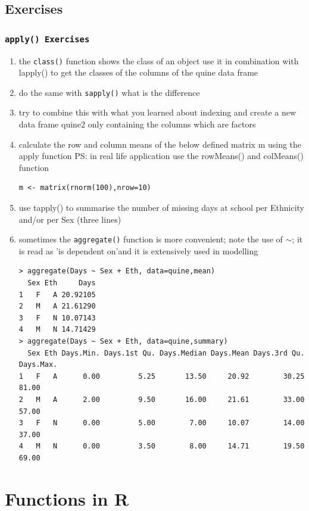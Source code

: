\documentclass[xcolor={table},c]{beamer}
\begin{document}
\subsection{Exercises}
\begin{frame}\frametitle{\texttt{\texttt{apply()} Exercises}}
  \begin{enumerate}
  \item  the \texttt{class()} function shows the class of an object use it in combination with lapply() to get the  classes of the columns of the quine data frame
  \item  do the same with \texttt{sapply()}  what is the difference
  \item try to combine this with what you learned about indexing and create a new data frame quine2 only containing the columns which are factors
  \item  calculate the row and column means of the below defined matrix m using the apply function PS: in real life application use the rowMeans() and colMeans() function 
\begin{verbatim}
m <- matrix(rnorm(100),nrow=10)  
\end{verbatim}
\item  use tapply() to summarise the number of missing days at school per Ethnicity and/or per Sex (three lines)
\item  sometimes the \texttt{aggregate()} function is more convenient; note the use of $\sim$; it is read as 'is dependent on'and it is extensively used in modelling
\tiny
\begin{verbatim}
> aggregate(Days ~ Sex + Eth, data=quine,mean)
  Sex Eth     Days
1   F   A 20.92105
2   M   A 21.61290
3   F   N 10.07143
4   M   N 14.71429
> aggregate(Days ~ Sex + Eth, data=quine,summary)
  Sex Eth Days.Min. Days.1st Qu. Days.Median Days.Mean Days.3rd Qu. Days.Max.
1   F   A      0.00         5.25       13.50     20.92        30.25     81.00
2   M   A      2.00         9.50       16.00     21.61        33.00     57.00
3   F   N      0.00         5.00        7.00     10.07        14.00     37.00
4   M   N      0.00         3.50        8.00     14.71        19.50     69.00  
\end{verbatim}
  \end{enumerate}
\end{frame}

\section{Functions in R}
\end{document}
